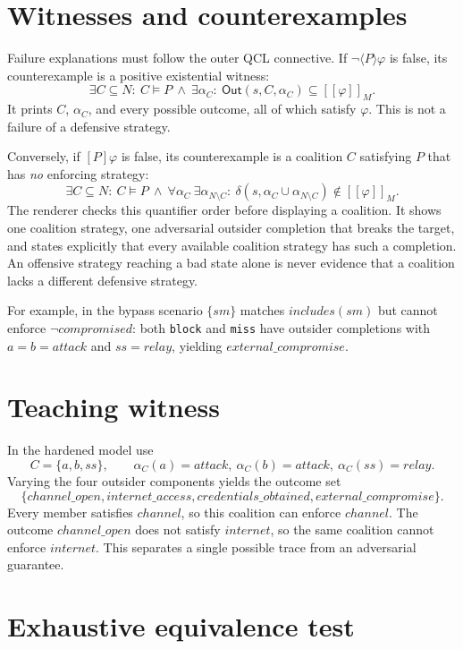 \documentclass[11pt]{article}
\newcommand{\Agents}{\mathit{N}}
\newcommand{\Out}{\mathsf{Out}}
\newcommand{\denote}[1]{\left[\!\left[ #1 \right]\!\right]}
\begin{document}
\section{Witnesses and counterexamples}

Failure explanations must follow the outer QCL connective. If
$\neg\langle P\rangle\varphi$ is false, its counterexample is a positive
existential witness:
\[
 \exists C\subseteq\Agents:\ C\models P\ \land\
 \exists\alpha_C:\ \Out(s,C,\alpha_C)\subseteq\denote{\varphi}_M.
\]
It prints $C$, $\alpha_C$, and every possible outcome, all of which satisfy
$\varphi$. This is not a failure of a defensive strategy.

Conversely, if $[P]\varphi$ is false, its counterexample is a coalition
$C$ satisfying $P$ that has \emph{no} enforcing strategy:
\[
 \exists C\subseteq\Agents:\ C\models P\ \land\
 \forall\alpha_C\ \exists\alpha_{\Agents\setminus C}:\
 \delta(s,\alpha_C\cup\alpha_{\Agents\setminus C})
 \notin\denote{\varphi}_M.
\]
The renderer checks this quantifier order before displaying a coalition. It
shows one coalition strategy, one adversarial outsider completion that breaks
the target, and states explicitly that every available coalition strategy has
such a completion. An offensive strategy reaching a bad state alone is never
evidence that a coalition lacks a different defensive strategy.

For example, in the bypass scenario $\{sm\}$ matches
$includes(sm)$ but cannot enforce $\neg compromised$: both \texttt{block}
and \texttt{miss} have outsider completions with $a=b=attack$ and
$ss=relay$, yielding $external\_compromise$.

\section{Teaching witness}

In the hardened model use
\[
 C=\{a,b,ss\},\qquad
 \alpha_C(a)=attack,\ \alpha_C(b)=attack,\ \alpha_C(ss)=relay.
\]
Varying the four outsider components yields the outcome set
\[
 \{channel\_open,internet\_access,credentials\_obtained,
 external\_compromise\}.
\]
Every member satisfies $channel$, so this coalition can enforce $channel$.
The outcome $channel\_open$ does not satisfy $internet$, so the same coalition
cannot enforce $internet$. This separates a single possible trace from an
adversarial guarantee.

\section{Exhaustive equivalence test}
\end{document}
